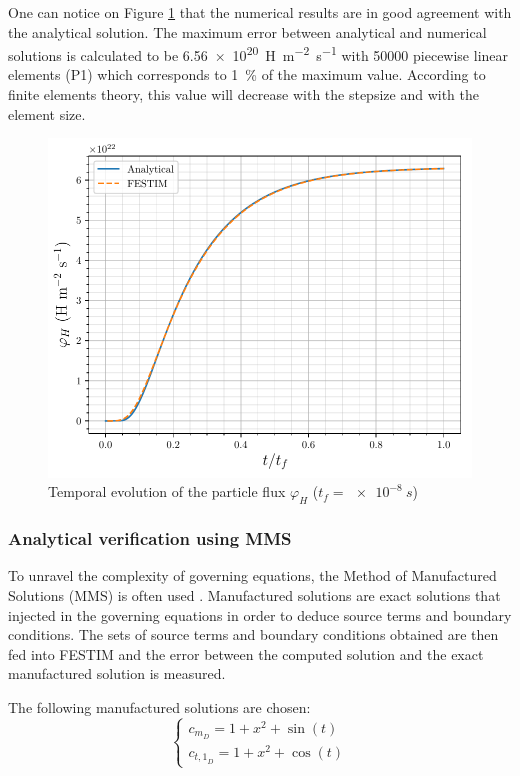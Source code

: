 One can notice on Figure \ref{fig:FESTIM vs analytical} that the numerical results are in good agreement with the analytical solution.
The maximum error between analytical and numerical solutions is calculated to be \SI{6.56e20}{H.m^{-2}.s^{-1}} with 50000 piecewise linear elements (P1) which corresponds to \SI{1}{\%} of the maximum value.
According to finite elements theory, this value will decrease with the stepsize and with the element size.
\begin{figure}
    \centering
    \includegraphics[width=\linewidth]{Figures/Chapter3/FESTIM_vs_analytical.pdf}
    \caption{Temporal evolution of the particle flux $\varphi_H$ ($t_f = \SI{e-8}{s}$)}
    \label{fig:FESTIM vs analytical}
\end{figure}
\subsubsection{Analytical verification using MMS} \label{mms}

To unravel the complexity of governing equations, the Method of Manufactured Solutions (MMS) is often used .
Manufactured solutions are exact solutions that injected in the governing equations in order to deduce source terms and boundary conditions.
The sets of source terms and boundary conditions obtained are then fed into FESTIM and the error between the computed solution and the exact manufactured solution is measured.


The following manufactured solutions are chosen:
\begin{equation}
    \begin{cases}
    c_{m_D} = 1 + x^2 + \sin(t) \\
    c_{{t,1}_D} = 1 + x^2 + \cos(t)
    \end{cases}
    \label{eq: manufactured solutions}
\end{equation}

